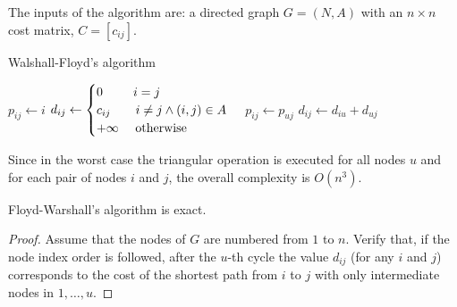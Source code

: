 \documentclass[12pt, a4paper]{report}
\begin{document}
    The inputs of the algorithm are: a directed graph $G = (N,A)$ with an $n \times n$ cost matrix, $C = [c_{ij}]$.
    \begin{algorithm}[H]
        \caption{Walshall-Floyd's algorithm}
            \begin{algorithmic}[1]
                        \State $p_{ij} \leftarrow i$
                        \State $d_{ij} \leftarrow \begin{cases}
                            0 \:\:\:\:\:\:\:\:\:\:\: i = j \\
                            c_{ij} \:\:\:\:\:\:\:\:\: i \neq j \land (i,j) \in A \\
                            +\infty \:\:\:\:\:\: \textnormal{otherwise}
                        \end{cases}$
                    \EndFor
                \EndFor
                                \State $p_{ij} \leftarrow p_{uj}$
                                \State $d_{ij} \leftarrow d_{iu}+d_{uj}$
                            \EndIf
                        \EndFor
                    \EndFor
                            \State \Return
                        \EndIf
                    \EndFor
                \EndFor
            \end{algorithmic}
    \end{algorithm}
    Since in the worst case the triangular operation is executed for all nodes $u$ and for each pair of nodes $i$ and $j$, the overall complexity is $O(n^3)$. 
    \begin{proposition}
        Floyd-Warshall's algorithm is exact. 
    \end{proposition}
    \begin{proof}
        Assume that the nodes of $G$ are numbered from $1$ to $n$. Verify that, if the node index order is followed, after the $u$-th cycle the value $d_{ij}$ (for any $i$ and $j$) corresponds to the cost of 
        the shortest path from $i$ to $j$ with only intermediate nodes in ${1,\dots,u}$. 
    \end{proof}
\end{document}
